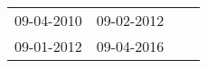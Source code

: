 \begin{supertabular}{llll}
 09-04-2010 &  09-02-2012 \\
 09-01-2012 &  09-04-2016 \\
\end{supertabular}
